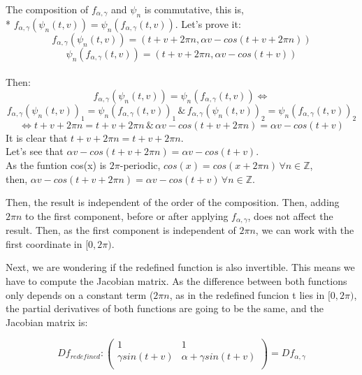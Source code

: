\documentclass[a4paper]{article}
\begin{document}
The composition of $f_{\alpha,\gamma}$ and $\psi_n$ is commutative, this is,
\\*
$f_{\alpha,\gamma}(\psi_n(t,v))=\psi_n(f_{\alpha,\gamma}(t,v))$.
Let's prove it:
\begin{equation}
f_{\alpha,\gamma}(\psi_n(t,v))=(t+v+2\pi n,\alpha v-cos(t+v+2\pi n))
\end{equation}
\begin{equation}
\psi_n(f_{\alpha,\gamma}(t,v))=(t+v+2\pi n,\alpha v-cos(t+v))
\end{equation}
\\
Then:
$$
f_{\alpha,\gamma}(\psi_n(t,v))=\psi_n(f_{\alpha,\gamma}(t,v)) \Longleftrightarrow$$
$$f_{\alpha,\gamma}(\psi_n(t,v))_1=\psi_n(f_{\alpha,\gamma}(t,v))_1 \,\& \,
f_{\alpha,\gamma}(\psi_n(t,v))_2=\psi_n(f_{\alpha,\gamma}(t,v))_2
$$
$$
\Longleftrightarrow t+v+2\pi n=t+v+2\pi n \, \& \, \alpha v-cos(t+v+2\pi n) = \alpha v-cos(t+v)
$$   
It is clear that $t+v+2\pi n=t+v+2\pi n$.\\
Let's see that $\alpha v-cos(t+v+2\pi n) = \alpha v-cos(t+v)$.
\\As the funtion cos(x) is $2\pi$-periodic, $cos(x)=cos(x+2\pi n) \, \forall n\in \mathbb{Z}$,
\\then, $\alpha v-cos(t+v+2\pi n) = \alpha v-cos(t+v) \, \forall n\in \mathbb{Z}$.

Then, the result is independent of the order of the composition.
Then, adding $2\pi n$ to the first component, before or after applying $f_{\alpha,\gamma}$,
does not affect the result.
Then, as the first component is independent of $2\pi n$, we can work with the first coordinate in $[0,2\pi)$.




\newpage




Next, we are wondering if the redefined function is also invertible.
This means we have to compute the Jacobian matrix.
As the difference between both functions only depends on a constant term ($2\pi n$,
as in the redefined funcion t lies in $[0,2\pi)$,
the partial derivatives of both functions are going to be the same, and the Jacobian matrix is:

\begin{equation}\label{secMod_dfRedefined}
Df_{redefined}:\begin{pmatrix} 
1 & 1\\
\gamma sin(t+v) & \alpha + \gamma sin(t+v)\\
\end{pmatrix}=Df_{\alpha,\gamma}
\end{equation}
\end{document}
